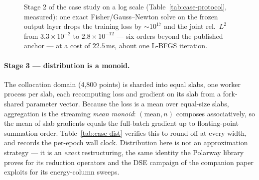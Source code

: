 \documentclass[11pt,a4paper]{article}
\theoremstyle{plain}
\theoremstyle{definition}
\begin{document}
\begin{figure}[h]
\centering
{}
\caption{Stage 2 of the case study on a log scale
(Table~\protect\ref{tab:case-protocol}, measured): one exact Fisher/Gauss--Newton
solve on the frozen output layer drops the training loss by
$\sim$$10^{17}$ and the joint rel.\ $L^{2}$ from $3.3\times10^{-2}$ to
$2.8\times10^{-12}$ --- six orders beyond the published anchor --- at a
cost of $22.5$\,ms, about one L-BFGS iteration.}
\label{fig:gnreadout}
\end{figure}

\paragraph{Stage 3 --- distribution is a monoid.}
The collocation domain (4{,}800 points) is sharded into equal slabs, one
worker process per slab, each recomputing loss and gradient on its slab from
a fork-shared parameter vector. Because the loss is a mean over equal-size
slabs, aggregation is the streaming \emph{mean monoid}:
$(\mathrm{mean}, n)$ composes associatively, so the mean of slab gradients
equals the full-batch gradient up to floating-point summation order.
Table~\ref{tab:case-dist} verifies this to round-off at every width, and
records the per-epoch wall clock. Distribution here is not an approximation
strategy --- it is an \emph{exact} restructuring, the same identity the
Polarway library \cite{alvarez2026polarway} proves for its reduction operators
and the DSE campaign of the companion paper exploits for its energy-column
sweeps.
\end{document}
